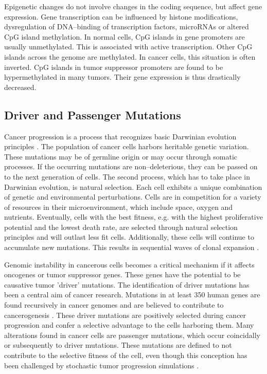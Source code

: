     Epigenetic changes do not involve changes in the coding sequence,
    but affect gene expression. Gene transcription can be influenced by histone
    modifications, dysregulation of DNA--binding of transcription factors,
    microRNAs or altered CpG island methylation. In normal cells, CpG islands in
    gene promoters are usually unmethylated. This is associated with active
    transcription. Other CpG islands across the genome are methylated.
    In cancer cells, this situation is often inverted. CpG islands in tumor
    suppressor promoters are found to be hypermethylated in many tumors. Their
    gene expression is thus drastically decreased.

  \subsection{Driver and Passenger Mutations}

    Cancer progression is a process that recognizes basic Darwinian evolution
    principles {\cite{clonal_evolution}} {\cite{darwinian_models}}
    {\cite{war_zone}} {\cite{cancer_models}}. The population of cancer cells
    harbors heritable genetic variation. These mutations may be of germline
    origin or may occur through somatic processes. If the occurring mutations
    are non--deleterious, they can be passed on to the next generation of
    cells. The second process, which has to take place in Darwinian evolution,
    is natural selection. Each cell exhibits a unique combination of genetic
    and environmental perturbations. Cells are in competition for a variety of
    resources in their microenvironment, which include space, oxygen and
    nutrients. Eventually, cells with the best fitness, e.g. with the highest
    proliferative potential and the lowest death rate, are selected
    through natural selection principles and will outlast less fit
    cells. Additionally, these cells will continue to accumulate new
    mutations. This results in sequential waves of clonal expansion
    {\cite{clonal_evolution}}.

    Genomic instability in cancerous cells becomes a critical mechanism if it
    affects oncogenes or tumor suppressor genes. These genes have the potential to
    be causative tumor 'driver' mutations. The identification of driver
    mutations has been a central aim of cancer research. Mutations in at least
    350 human genes are found recursively in cancer genomes and are believed
    to contribute to cancerogenesis {\cite{cancer_genome}}. These driver
    mutations are positively selected during cancer progression and confer a
    selective advantage to the cells harboring them. Many alterations found in
    cancer cells are passenger mutations, which occur coincidally or
    subsequently to driver mutations. These mutations are defined to not
    contribute to the selective fitness of the cell, even though this
    conception has been challenged by stochastic tumor progression simulations
    {\cite{stochastic_cancer}}.

